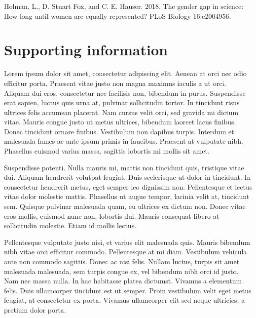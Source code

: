 \documentclass[12pt,]{article}
\begin{document}
\hypertarget{refs}{}
\hypertarget{ref-Holman_2018}{}
Holman, L., D. Stuart Fox, and C. E. Hauser. 2018. The gender gap in
science: How long until women are equally represented? PLoS Biology
16:e2004956.

\newpage

\section{Supporting information}\label{supporting-information}

Lorem ipsum dolor sit amet, consectetur adipiscing elit. Aenean at orci
nec odio efficitur porta. Praesent vitae justo non magna maximus iaculis
a ut orci. Aliquam dui eros, consectetur nec facilisis non, bibendum in
purus. Suspendisse erat sapien, luctus quis urna at, pulvinar
sollicitudin tortor. In tincidunt risus ultrices felis accumsan
placerat. Nam cursus velit orci, sed gravida mi dictum vitae. Mauris
congue justo ut metus ultrices, bibendum laoreet lacus finibus. Donec
tincidunt ornare finibus. Vestibulum non dapibus turpis. Interdum et
malesuada fames ac ante ipsum primis in faucibus. Praesent at vulputate
nibh. Phasellus euismod varius massa, sagittis lobortis mi mollis sit
amet.

Suspendisse potenti. Nulla mauris mi, mattis non tincidunt quis,
tristique vitae dui. Aliquam hendrerit volutpat feugiat. Duis
scelerisque ut dolor in tincidunt. In consectetur hendrerit metus, eget
semper leo dignissim non. Pellentesque et lectus vitae dolor molestie
mattis. Phasellus ut augue tempor, lacinia velit at, tincidunt sem.
Quisque pulvinar malesuada quam, eu ultrices ex dictum non. Donec vitae
eros mollis, euismod nunc non, lobortis dui. Mauris consequat libero at
sollicitudin molestie. Etiam id mollis lectus.

Pellentesque vulputate justo nisi, et varius elit malesuada quis. Mauris
bibendum nibh vitae orci efficitur commodo. Pellentesque at mi diam.
Vestibulum vehicula ante non commodo sagittis. Donec ac nisi felis.
Nullam luctus, turpis sit amet malesuada malesuada, sem turpis congue
ex, vel bibendum nibh orci id justo. Nam nec massa nulla. In hac
habitasse platea dictumst. Vivamus a elementum felis. Duis ullamcorper
tincidunt est ut semper. Proin vestibulum velit eget metus feugiat, at
consectetur ex porta. Vivamus ullamcorper elit sed neque ultricies, a
pretium dolor porta.
\end{document}

